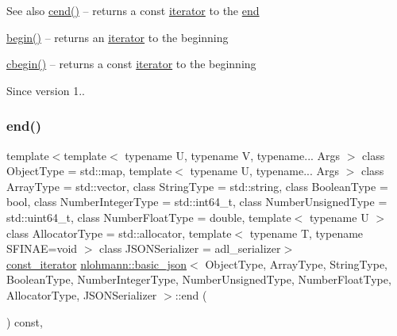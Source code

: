 \begin{DoxySeeAlso}{See also}
\mbox{\hyperlink{classnlohmann_1_1basic__json_a8dba7b7d2f38e6b0c614030aa43983f6}{cend()}} -- returns a const \mbox{\hyperlink{classnlohmann_1_1basic__json_a099316232c76c034030a38faa6e34dca}{iterator}} to the \mbox{\hyperlink{classnlohmann_1_1basic__json_a13e032a02a7fd8a93fdddc2fcbc4763c}{end}} 

\mbox{\hyperlink{classnlohmann_1_1basic__json_a0ff28dac23f2bdecee9564d07f51dcdc}{begin()}} -- returns an \mbox{\hyperlink{classnlohmann_1_1basic__json_a099316232c76c034030a38faa6e34dca}{iterator}} to the beginning 

\mbox{\hyperlink{classnlohmann_1_1basic__json_ad865d6c291b237ae508d5cb2146b5877}{cbegin()}} -- returns a const \mbox{\hyperlink{classnlohmann_1_1basic__json_a099316232c76c034030a38faa6e34dca}{iterator}} to the beginning
\end{DoxySeeAlso}
\begin{DoxySince}{Since}
version 1.. 
\end{DoxySince}
\mbox{\label{classnlohmann_1_1basic__json_a1c15707055088cd5436ae91db72cbe67}} 
\subsubsection{\texorpdfstring{end()}{end()}\hspace{0.1cm}{\footnotesize\ttfamily [2/2]}}
{\footnotesize\ttfamily template$<$template$<$ typename U, typename V, typename... Args $>$ class Object\+Type = std\+::map, template$<$ typename U, typename... Args $>$ class Array\+Type = std\+::vector, class String\+Type  = std\+::string, class Boolean\+Type  = bool, class Number\+Integer\+Type  = std\+::int64\+\_\+t, class Number\+Unsigned\+Type  = std\+::uint64\+\_\+t, class Number\+Float\+Type  = double, template$<$ typename U $>$ class Allocator\+Type = std\+::allocator, template$<$ typename T, typename S\+F\+I\+N\+A\+E=void $>$ class J\+S\+O\+N\+Serializer = adl\+\_\+serializer$>$ \\
\mbox{\hyperlink{classnlohmann_1_1basic__json_a41a70cf9993951836d129bb1c2b3126a}{const\+\_\+iterator}} \mbox{\hyperlink{classnlohmann_1_1basic__json}{nlohmann\+::basic\+\_\+json}}$<$ Object\+Type, Array\+Type, String\+Type, Boolean\+Type, Number\+Integer\+Type, Number\+Unsigned\+Type, Number\+Float\+Type, Allocator\+Type, J\+S\+O\+N\+Serializer $>$\+::end (\begin{DoxyParamCaption}{ }\end{DoxyParamCaption}) const\hspace{0.3cm}{\ttfamily [inline]}, {\ttfamily [noexcept]}}



